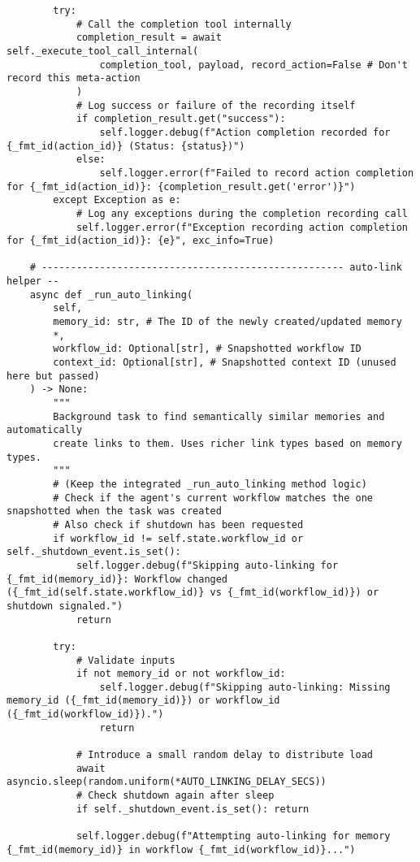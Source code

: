 \documentclass[12pt,a4paper]{article}
\begin{document}
\begin{pageablecode}
\begin{verbatim}
        try:
            # Call the completion tool internally
            completion_result = await self._execute_tool_call_internal(
                completion_tool, payload, record_action=False # Don't record this meta-action
            )
            # Log success or failure of the recording itself
            if completion_result.get("success"):
                self.logger.debug(f"Action completion recorded for {_fmt_id(action_id)} (Status: {status})")
            else:
                self.logger.error(f"Failed to record action completion for {_fmt_id(action_id)}: {completion_result.get('error')}")
        except Exception as e:
            # Log any exceptions during the completion recording call
            self.logger.error(f"Exception recording action completion for {_fmt_id(action_id)}: {e}", exc_info=True)

    # ---------------------------------------------------- auto‑link helper --
    async def _run_auto_linking(
        self,
        memory_id: str, # The ID of the newly created/updated memory
        *,
        workflow_id: Optional[str], # Snapshotted workflow ID
        context_id: Optional[str], # Snapshotted context ID (unused here but passed)
    ) -> None:
        """
        Background task to find semantically similar memories and automatically
        create links to them. Uses richer link types based on memory types.
        """
        # (Keep the integrated _run_auto_linking method logic)
        # Check if the agent's current workflow matches the one snapshotted when the task was created
        # Also check if shutdown has been requested
        if workflow_id != self.state.workflow_id or self._shutdown_event.is_set():
            self.logger.debug(f"Skipping auto-linking for {_fmt_id(memory_id)}: Workflow changed ({_fmt_id(self.state.workflow_id)} vs {_fmt_id(workflow_id)}) or shutdown signaled.")
            return

        try:
            # Validate inputs
            if not memory_id or not workflow_id:
                self.logger.debug(f"Skipping auto-linking: Missing memory_id ({_fmt_id(memory_id)}) or workflow_id ({_fmt_id(workflow_id)}).")
                return

            # Introduce a small random delay to distribute load
            await asyncio.sleep(random.uniform(*AUTO_LINKING_DELAY_SECS))
            # Check shutdown again after sleep
            if self._shutdown_event.is_set(): return

            self.logger.debug(f"Attempting auto-linking for memory {_fmt_id(memory_id)} in workflow {_fmt_id(workflow_id)}...")


\end{verbatim}
\end{pageablecode}
\end{document}
